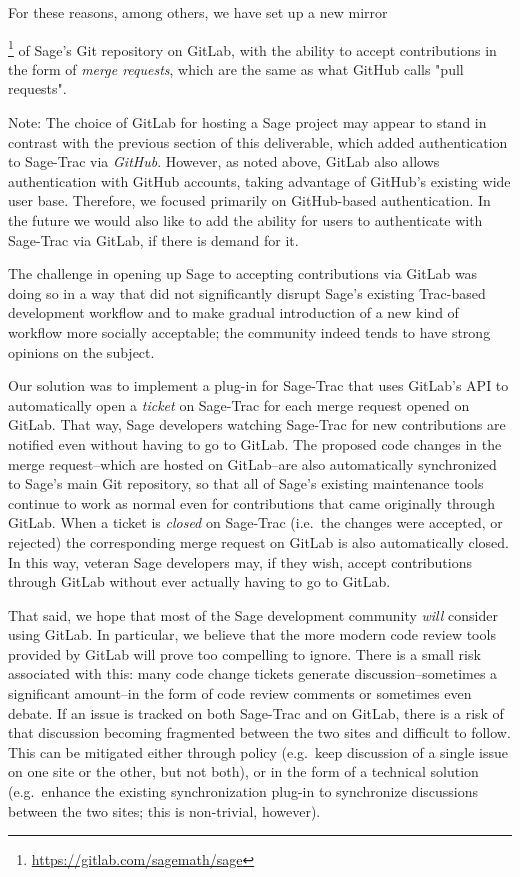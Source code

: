 For these reasons, among others, we have set up a new
mirror{\footnote{\url{https://gitlab.com/sagemath/sage}} of Sage's Git
repository on GitLab, with the ability to accept contributions in the form of
{\em merge requests}, which are the same as what GitHub calls "pull requests".

Note: The choice of GitLab for hosting a Sage project may appear to stand in
contrast with the previous section of this deliverable, which added
authentication to Sage-Trac via {\em GitHub}.  However, as noted above, GitLab
also allows authentication with GitHub accounts, taking advantage of GitHub's
existing wide user base.  Therefore, we focused primarily on GitHub-based
authentication.  In the future we would also like to add the ability for users
to authenticate with Sage-Trac via GitLab, if there is demand for it.

The challenge in opening up Sage to accepting contributions via GitLab was
doing so in a way that did not significantly disrupt Sage's existing Trac-based
development workflow and to make gradual introduction of a new kind of workflow
more socially acceptable; the community indeed tends to have strong opinions on
the subject.

Our solution was to implement a plug-in for Sage-Trac that uses GitLab's API to
automatically open a {\em ticket} on Sage-Trac for each merge request opened on
GitLab.  That way, Sage developers watching Sage-Trac for new contributions are
notified even without having to go to GitLab.  The proposed code changes in the
merge request--which are hosted on GitLab--are also automatically synchronized
to Sage's main Git repository, so that all of Sage's existing maintenance tools
continue to work as normal even for contributions that came originally through
GitLab.  When a ticket is {\em closed} on Sage-Trac (i.e.~the changes were
accepted, or rejected) the corresponding merge request on GitLab is also
automatically closed.  In this way, veteran Sage developers may, if they wish,
accept contributions through GitLab without ever actually having to go to
GitLab.

That said, we hope that most of the Sage development community {\em will}
consider using GitLab.  In particular, we believe that the more modern code
review tools provided by GitLab will prove too compelling to ignore.  There
is a small risk associated with this: many code change tickets generate
discussion--sometimes a significant amount--in the form of code review comments
or sometimes even debate.  If an issue is tracked on both Sage-Trac and on
GitLab, there is a risk of that discussion becoming fragmented between the two
sites and difficult to follow.  This can be mitigated either through policy
(e.g.~keep discussion of a single issue on one site or the other, but not
both), or in the form of a technical solution (e.g.~enhance the existing
synchronization plug-in to synchronize discussions between the two sites; this
is non-trivial, however).

}
